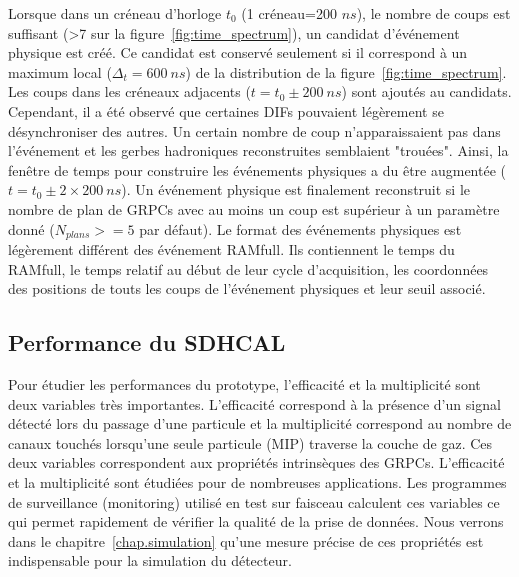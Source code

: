 Lorsque dans un créneau d'horloge $t_0$ (1 créneau=200 $ns$), le nombre de coups est suffisant (>7 sur la figure~\ref{fig:time_spectrum}), un candidat d'événement physique est créé. Ce candidat est conservé seulement si il correspond à un maximum local ($\Delta_t=600~ns$) de la distribution de la figure~\ref{fig:time_spectrum}. Les coups dans les créneaux adjacents ($t=t_0\pm200~ns$) sont ajoutés au candidats. Cependant, il a été observé que certaines DIFs pouvaient légèrement se désynchroniser des autres. Un certain nombre de coup n'apparaissaient pas dans l'événement et les gerbes hadroniques reconstruites semblaient "trouées". Ainsi, la fenêtre de temps pour construire les événements physiques a du être augmentée ($t=t_0\pm 2\times200~ns$). Un événement physique est finalement reconstruit si le nombre de plan de GRPCs avec au moins un coup est supérieur à un paramètre donné ($N_{plans}>=5$ par défaut). Le format des événements physiques est légèrement différent des événement RAMfull. Ils contiennent le temps du RAMfull, le temps relatif au début de leur cycle d'acquisition, les coordonnées des positions de touts les coups de l'événement physiques et leur seuil associé.

\subsection{Performance du SDHCAL}
\label{sec.muons}
Pour étudier les performances du prototype, l'efficacité et la multiplicité sont deux variables très importantes. L'efficacité correspond à la présence d'un signal détecté lors du passage d'une particule et la multiplicité correspond au nombre de canaux touchés lorsqu'une seule particule (MIP) traverse la couche de gaz. Ces deux variables correspondent aux propriétés intrinsèques des GRPCs. L'efficacité et la multiplicité sont étudiées pour de nombreuses applications. Les programmes de surveillance (monitoring) utilisé en test sur faisceau calculent ces variables ce qui permet rapidement de vérifier la qualité de la prise de données. Nous verrons dans le chapitre~\ref{chap.simulation} qu'une mesure précise de ces propriétés est indispensable pour la simulation du détecteur.
